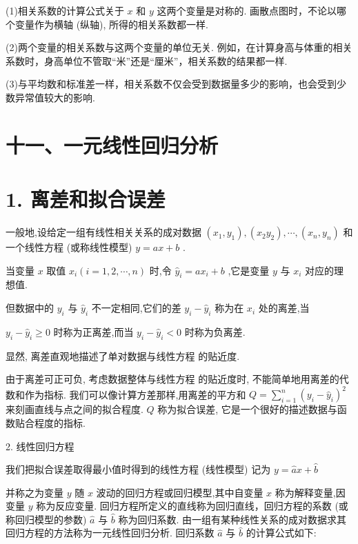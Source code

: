 (1)相关系数的计算公式关于 $x$ 和 $y$ 这两个变量是对称的. 画散点图时，不论以哪个变量作为横轴 (纵轴), 所得的相关系数都一样.

(2)两个变量的相关系数与这两个变量的单位无关. 例如，在计算身高与体重的相关系数时，身高单位不管取“米”还是“厘米”，相关系数的结果都一样.

(3)与平均数和标准差一样，相关系数不仅会受到数据量多少的影响，也会受到少数异常值较大的影响.

\section*{十一、一元线性回归分析}

\section*{1. 离差和拟合误差}

一般地,设给定一组有线性相关关系的成对数据 $\left( {{x}_{1},{y}_{1}}\right) ,\left( {{x}_{2}{y}_{2}}\right) ,\cdots ,\left( {{x}_{n},{y}_{n}}\right)$ 和一个线性方程 (或称线性模型) $y = {ax} + b$ .

当变量 $x$ 取值 ${x}_{i}\left( {i = 1,2,\cdots ,n}\right)$ 时,令 ${\widehat{y}}_{i} = a{x}_{i} + b$ ,它是变量 $y$ 与 ${x}_{i}$ 对应的理想值.

但数据中的 ${y}_{i}$ 与 ${\widehat{y}}_{i}$ 不一定相同,它们的差 ${y}_{i} - {\widehat{y}}_{i}$ 称为在 ${x}_{i}$ 处的离差,当

${y}_{i} - {\widehat{y}}_{i} \geq  0$ 时称为正离差,而当 ${y}_{i} - {\widehat{y}}_{i} < 0$ 时称为负离差.

显然, 离差直观地描述了单对数据与线性方程  的贴近度.

由于离差可正可负, 考虑数据整体与线性方程  的贴近度时, 不能简单地用离差的代数和作为指标. 我们可以像计算方差那样,用离差的平方和 $Q = \mathop{\sum }\limits_{{i = 1}}^{n}{\left( {y}_{i} - {\widehat{y}}_{i}\right) }^{2}$ 来刻画直线与点之间的拟合程度. $Q$ 称为拟合误差, 它是一个很好的描述数据与函数贴合程度的指标.

2. 线性回归方程

我们把拟合误差取得最小值时得到的线性方程 (线性模型) 记为 $y = \widehat{a}x + \widehat{b}$   

并称之为变量 $y$ 随 $x$ 波动的回归方程或回归模型,其中自变量 $x$ 称为解释变量,因变量 $y$ 称为反应变量. 回归方程所定义的直线称为回归直线，回归方程的系数 (或称回归模型的参数) $\widehat{a}$ 与 $\widehat{b}$ 称为回归系数. 由一组有某种线性关系的成对数据求其回归方程的方法称为一元线性回归分析. 回归系数 $\widehat{a}$ 与 $\widehat{b}$ 的计算公式如下:

